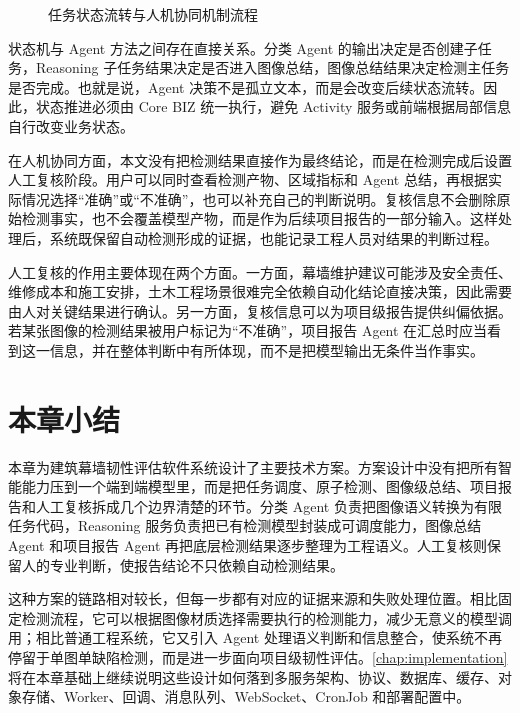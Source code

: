 \begin{figure}[!htbp]
{
  }
  \caption{任务状态流转与人机协同机制流程}\label{fig:design-task-state-human-review-flow}
\end{figure}

状态机与 Agent 方法之间存在直接关系。分类 Agent 的输出决定是否创建子任务，Reasoning 子任务结果决定是否进入图像总结，图像总结结果决定检测主任务是否完成。也就是说，Agent 决策不是孤立文本，而是会改变后续状态流转。因此，状态推进必须由 Core BIZ 统一执行，避免 Activity 服务或前端根据局部信息自行改变业务状态。

在人机协同方面，本文没有把检测结果直接作为最终结论，而是在检测完成后设置人工复核阶段。用户可以同时查看检测产物、区域指标和 Agent 总结，再根据实际情况选择“准确”或“不准确”，也可以补充自己的判断说明。复核信息不会删除原始检测事实，也不会覆盖模型产物，而是作为后续项目报告的一部分输入。这样处理后，系统既保留自动检测形成的证据，也能记录工程人员对结果的判断过程。

人工复核的作用主要体现在两个方面。一方面，幕墙维护建议可能涉及安全责任、维修成本和施工安排，土木工程场景很难完全依赖自动化结论直接决策，因此需要由人对关键结果进行确认。另一方面，复核信息可以为项目级报告提供纠偏依据。若某张图像的检测结果被用户标记为“不准确”，项目报告 Agent 在汇总时应当看到这一信息，并在整体判断中有所体现，而不是把模型输出无条件当作事实。

\section{本章小结}
\label{sec:design-chapter-summary}

本章为建筑幕墙韧性评估软件系统设计了主要技术方案。方案设计中没有把所有智能能力压到一个端到端模型里，而是把任务调度、原子检测、图像级总结、项目报告和人工复核拆成几个边界清楚的环节。分类 Agent 负责把图像语义转换为有限任务代码，Reasoning 服务负责把已有检测模型封装成可调度能力，图像总结 Agent 和项目报告 Agent 再把底层检测结果逐步整理为工程语义。人工复核则保留人的专业判断，使报告结论不只依赖自动检测结果。

这种方案的链路相对较长，但每一步都有对应的证据来源和失败处理位置。相比固定检测流程，它可以根据图像材质选择需要执行的检测能力，减少无意义的模型调用；相比普通工程系统，它又引入 Agent 处理语义判断和信息整合，使系统不再停留于单图单缺陷检测，而是进一步面向项目级韧性评估。\cref{chap:implementation}将在本章基础上继续说明这些设计如何落到多服务架构、协议、数据库、缓存、对象存储、Worker、回调、消息队列、WebSocket、CronJob 和部署配置中。
